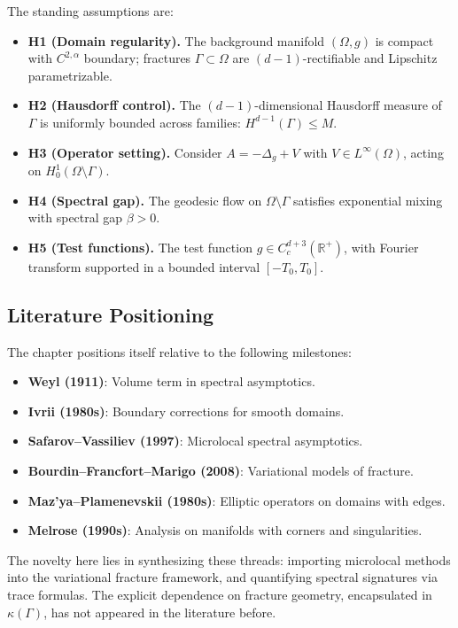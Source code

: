 The standing assumptions are:

\begin{itemize}
    \item \textbf{H1 (Domain regularity).} The background manifold $(\Omega, g)$ is compact with $C^{2,\alpha}$ boundary; fractures $\Gamma \subset \Omega$ are $(d-1)$-rectifiable and Lipschitz parametrizable.
    \item \textbf{H2 (Hausdorff control).} The $(d-1)$-dimensional Hausdorff measure of $\Gamma$ is uniformly bounded across families: $H^{d-1}(\Gamma) \leq M$.
    \item \textbf{H3 (Operator setting).} Consider $A = -\Delta_g + V$ with $V \in L^\infty(\Omega)$, acting on $H^1_0(\Omega \setminus \Gamma)$.
    \item \textbf{H4 (Spectral gap).} The geodesic flow on $\Omega \setminus \Gamma$ satisfies exponential mixing with spectral gap $\beta > 0$.
    \item \textbf{H5 (Test functions).} The test function $g \in C^{d+3}_c(\mathbb{R}^+)$, with Fourier transform supported in a bounded interval $[-T_0,T_0]$.
\end{itemize}

\subsection*{Literature Positioning}

The chapter positions itself relative to the following milestones:

\begin{itemize}
    \item \textbf{Weyl (1911)}: Volume term in spectral asymptotics.
    \item \textbf{Ivrii (1980s)}: Boundary corrections for smooth domains.
    \item \textbf{Safarov–Vassiliev (1997)}: Microlocal spectral asymptotics.
    \item \textbf{Bourdin–Francfort–Marigo (2008)}: Variational models of fracture.
    \item \textbf{Maz’ya–Plamenevskii (1980s)}: Elliptic operators on domains with edges.
    \item \textbf{Melrose (1990s)}: Analysis on manifolds with corners and singularities.
\end{itemize}

The novelty here lies in synthesizing these threads: importing microlocal methods into the variational fracture framework, and quantifying spectral signatures via trace formulas. The explicit dependence on fracture geometry, encapsulated in $\kappa(\Gamma)$, has not appeared in the literature before.


